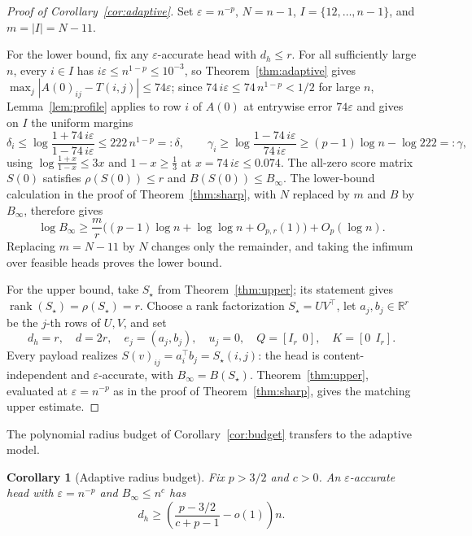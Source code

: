 \documentclass[10pt]{article} %
\newtheorem{corollary}[theorem]{Corollary}
\theoremstyle{definition}
\DeclareMathOperator{\rank}{rank}
\newcommand{\R}{\mathbb R}
\begin{document}
\begin{proof}[Proof of Corollary~\ref{cor:adaptive}]
Set \(\varepsilon=n^{-p}\), \(N=n-1\), \(I=\{12,\ldots,n-1\}\), and
\(m=|I|=N-11\).

For the lower bound, fix any \(\varepsilon\)-accurate head with
\(d_h\le r\).  For all sufficiently large \(n\), every \(i\in I\) has
\(i\varepsilon\le n^{1-p}\le10^{-3}\), so Theorem~\ref{thm:adaptive} gives
\(\max_j|A(0)_{ij}-T(i,j)|\le74\varepsilon\); since
\(74\,i\varepsilon\le74\,n^{1-p}<1/2\) for large \(n\),
Lemma~\ref{lem:profile} applies to row \(i\) of \(A(0)\) at entrywise
error \(74\varepsilon\) and gives on \(I\) the uniform margins
\[
 \delta_i\le\log\frac{1+74\,i\varepsilon}{1-74\,i\varepsilon}
 \le222\,n^{1-p}=:\delta,
 \qquad
 \gamma_i\ge\log\frac{1-74\,i\varepsilon}{74\,i\varepsilon}
 \ge(p-1)\log n-\log222=:\gamma,
\]
using \(\log\frac{1+x}{1-x}\le3x\) and \(1-x\ge\frac13\) at
\(x=74\,i\varepsilon\le0.074\).
The all-zero score matrix \(S(0)\) satisfies \(\rho(S(0))\le r\) and
\(B(S(0))\le B_\infty\).  The lower-bound calculation in the proof of
Theorem~\ref{thm:sharp}, with \(N\) replaced by \(m\) and \(B\) by
\(B_\infty\), therefore gives
\[
 \log B_\infty\ge\frac mr
 \bigl((p-1)\log n+\log\log n+O_{p,r}(1)\bigr)+O_p(\log n).
\]
Replacing \(m=N-11\) by \(N\) changes only the remainder, and taking the
infimum over feasible heads proves the lower bound.

For the upper bound, take \(S_\star\) from Theorem~\ref{thm:upper}; its
statement gives \(\rank(S_\star)=\rho(S_\star)=r\).  Choose a rank
factorization \(S_\star=UV^\top\), let \(a_j,b_j\in\R^r\) be the \(j\)-th
rows of \(U,V\), and set
\[
 d_h=r,\quad d=2r,\quad e_j=(a_j,b_j),\quad u_j=0,
 \quad Q=[I_r\ \ 0],\quad K=[0\ \ I_r].
\]
Every payload realizes \(S(v)_{ij}=a_i^\top b_j=S_\star(i,j)\): the head
is content-independent and \(\varepsilon\)-accurate, with
\(B_\infty=B(S_\star)\).  Theorem~\ref{thm:upper}, evaluated at
\(\varepsilon=n^{-p}\) as in the proof of Theorem~\ref{thm:sharp}, gives
the matching upper estimate.
\end{proof}

The polynomial radius budget of Corollary~\ref{cor:budget} transfers to
the adaptive model.

\begin{corollary}[Adaptive radius budget]\label{cor:adaptivebudget}
Fix \(p>3/2\) and \(c>0\).  An \(\varepsilon\)-accurate head with
\(\varepsilon=n^{-p}\) and \(B_\infty\le n^c\) has
\[
 d_h\ge\left(\frac{p-3/2}{c+p-1}-o(1)\right)n .
\]
\end{corollary}
\end{document}

